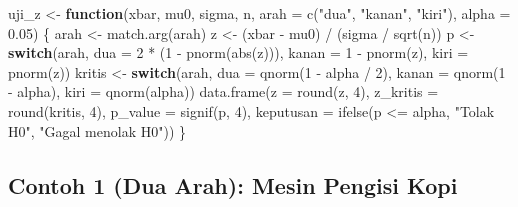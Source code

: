 \documentclass[
  indonesian,
  letterpaper,
]{book}
\newenvironment{Shaded}{\begin{snugshade}}{\end{snugshade}}
\newcommand{\AttributeTok}[1]{\textcolor[rgb]{0.40,0.45,0.13}{#1}}
\newcommand{\ControlFlowTok}[1]{\textcolor[rgb]{0.00,0.23,0.31}{\textbf{#1}}}
\newcommand{\DecValTok}[1]{\textcolor[rgb]{0.68,0.00,0.00}{#1}}
\newcommand{\FloatTok}[1]{\textcolor[rgb]{0.68,0.00,0.00}{#1}}
\newcommand{\FunctionTok}[1]{\textcolor[rgb]{0.28,0.35,0.67}{#1}}
\newcommand{\NormalTok}[1]{\textcolor[rgb]{0.00,0.23,0.31}{#1}}
\newcommand{\OtherTok}[1]{\textcolor[rgb]{0.00,0.23,0.31}{#1}}
\newcommand{\SpecialCharTok}[1]{\textcolor[rgb]{0.37,0.37,0.37}{#1}}
\newcommand{\StringTok}[1]{\textcolor[rgb]{0.13,0.47,0.30}{#1}}
\begin{document}
\begin{Shaded}
\begin{Highlighting}[]
\NormalTok{uji\_z    }\OtherTok{\textless{}{-}} \ControlFlowTok{function}\NormalTok{(xbar, mu0, sigma, n, }\AttributeTok{arah =} \FunctionTok{c}\NormalTok{(}\StringTok{"dua"}\NormalTok{, }\StringTok{"kanan"}\NormalTok{, }\StringTok{"kiri"}\NormalTok{), }\AttributeTok{alpha =} \FloatTok{0.05}\NormalTok{) \{}
\NormalTok{  arah   }\OtherTok{\textless{}{-}} \FunctionTok{match.arg}\NormalTok{(arah)}
\NormalTok{  z }\OtherTok{\textless{}{-}}\NormalTok{ (xbar }\SpecialCharTok{{-}}\NormalTok{ mu0) }\SpecialCharTok{/}\NormalTok{ (sigma }\SpecialCharTok{/} \FunctionTok{sqrt}\NormalTok{(n))}
\NormalTok{  p }\OtherTok{\textless{}{-}} \ControlFlowTok{switch}\NormalTok{(arah,}
              \AttributeTok{dua   =} \DecValTok{2} \SpecialCharTok{*}\NormalTok{ (}\DecValTok{1} \SpecialCharTok{{-}} \FunctionTok{pnorm}\NormalTok{(}\FunctionTok{abs}\NormalTok{(z))),}
              \AttributeTok{kanan =} \DecValTok{1} \SpecialCharTok{{-}} \FunctionTok{pnorm}\NormalTok{(z),}
              \AttributeTok{kiri  =} \FunctionTok{pnorm}\NormalTok{(z))}
\NormalTok{  kritis }\OtherTok{\textless{}{-}} \ControlFlowTok{switch}\NormalTok{(arah,}
                   \AttributeTok{dua   =} \FunctionTok{qnorm}\NormalTok{(}\DecValTok{1} \SpecialCharTok{{-}}\NormalTok{ alpha }\SpecialCharTok{/} \DecValTok{2}\NormalTok{),}
                   \AttributeTok{kanan =} \FunctionTok{qnorm}\NormalTok{(}\DecValTok{1} \SpecialCharTok{{-}}\NormalTok{ alpha),}
                   \AttributeTok{kiri  =} \FunctionTok{qnorm}\NormalTok{(alpha))}
  \FunctionTok{data.frame}\NormalTok{(}\AttributeTok{z =} \FunctionTok{round}\NormalTok{(z, }\DecValTok{4}\NormalTok{), }\AttributeTok{z\_kritis =} \FunctionTok{round}\NormalTok{(kritis, }\DecValTok{4}\NormalTok{), }\AttributeTok{p\_value =} \FunctionTok{signif}\NormalTok{(p, }\DecValTok{4}\NormalTok{),}
             \AttributeTok{keputusan =} \FunctionTok{ifelse}\NormalTok{(p }\SpecialCharTok{\textless{}=}\NormalTok{ alpha, }\StringTok{"Tolak H0"}\NormalTok{, }\StringTok{"Gagal menolak H0"}\NormalTok{))}
\NormalTok{\}}
\end{Highlighting}
\end{Shaded}

\subsection{Contoh 1 (Dua Arah): Mesin Pengisi
Kopi}\label{contoh-1-dua-arah-mesin-pengisi-kopi}
\end{document}

